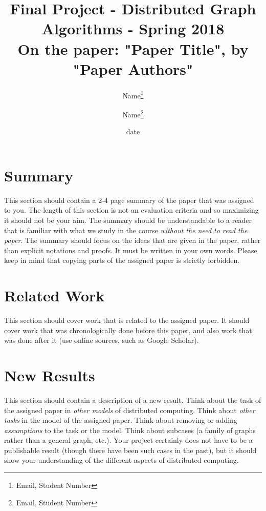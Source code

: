 \documentclass[11pt]{article}
\begin{document}
\title{Final Project - Distributed Graph Algorithms - Spring 2018\\
On the paper: "Paper Title", by "Paper Authors"
}
\author{Name\footnote{Email, Student Number} \and Name\footnote{Email, Student Number}
}
\date{date}
	\maketitle
\section{Summary}	
This section should contain a 2-4 page summary of the paper that was assigned to you. The length of this section is not an evaluation criteria and so maximizing it should not be your aim.
The summary should be understandable to a reader that is familiar with what we study in the course \emph{without the need to read the paper}. The summary should focus on the ideas that are given in the paper, rather than explicit notations and proofs. It must be written in your own words. Please keep in mind that copying parts of the assigned paper is strictly forbidden.
\section{Related Work}
This section should cover work that is related to the assigned paper. It should cover work that was chronologically done before this paper, and also work that was done after it (use online sources, such as Google Scholar).
\section{New Results}
This section should contain a description of a new result. Think about the task of the assigned paper in \emph{other models} of distributed computing. Think about \emph{other tasks} in the model of the assigned paper. Think about removing or adding \emph{assumptions} to the task or the model. Think about subcases (a family of graphs rather than a general graph, etc.). Your project certainly does not have to be a publishable result (though there have been such cases in the past), but it should show your understanding of the different aspects of distributed computing.

%
%
\end{document}
